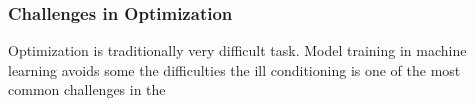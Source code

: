\subsubsection{Challenges in Optimization}

Optimization is traditionally very difficult task. Model training in machine learning avoids some the difficulties
the ill conditioning is one of the most common challenges in the 